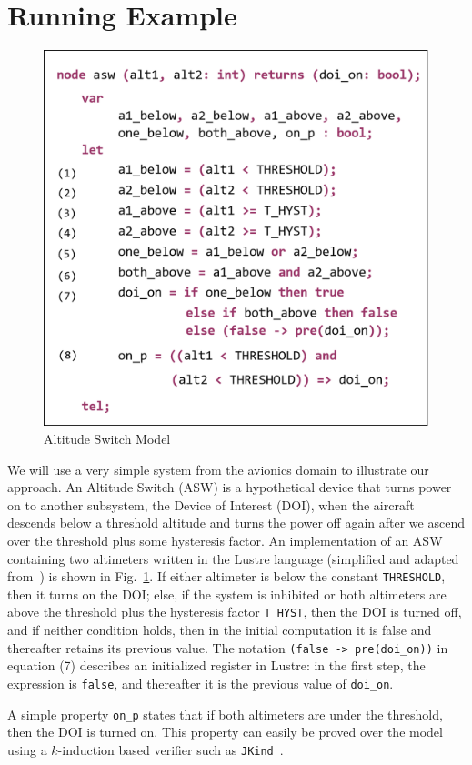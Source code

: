 \section{Running Example}
\label{sec:example}


\begin{figure}
\centering
\includegraphics[width=0.9\columnwidth]{figs/aswcode.png}
\vspace{-0.1in}
\caption{Altitude Switch Model }
\label{fig:asw}
\vspace{-0.2in}
\end{figure}

We will use a very simple system from the avionics domain to illustrate our approach. An Altitude Switch (ASW) is a hypothetical device that turns power on to another subsystem, the Device of Interest (DOI), when the aircraft descends below a threshold altitude and turns the power off again after we ascend over the threshold plus some hysteresis factor.  An implementation of an ASW containing two altimeters written in the Lustre language (simplified and adapted from~\cite{HCW02:ase-deviation}) is shown in Fig.~\ref{fig:asw}.  If either altimeter is below the constant {\small \texttt{THRESHOLD}}, then it turns on the DOI; else, if the system is inhibited or both altimeters are above the threshold plus the hysteresis factor {\small \texttt{T\_HYST}}, then the DOI is turned off, and if neither condition holds, then in the initial computation it is false and thereafter retains its previous value.  The notation {\small \texttt{(false -> pre(doi\_on))}} in equation (7) describes an initialized register in Lustre: in the first step, the expression is {\small \texttt{false}}, and thereafter it is the previous value of {\small \texttt{doi\_on}}.

A simple property {\small \texttt{on\_p}} states that if both altimeters are under the threshold, then the DOI is turned on.  This property can easily be proved over the model using a $k$-induction based verifier such as \texttt{JKind}~\cite{jkind}.


